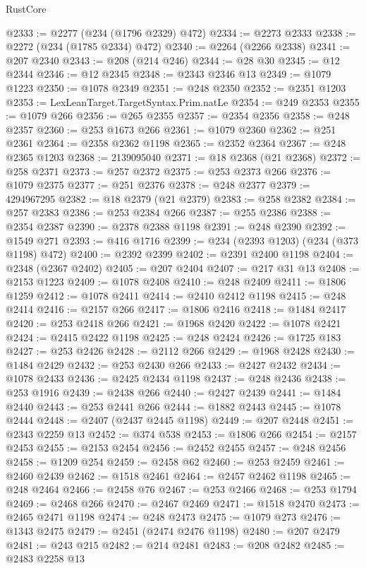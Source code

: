 \begin{lexlean}{RustCore}
\begin{coremodule}
@2333 := @2277 (@234 (@1796 @2329) @472)
@2334 := @2273 @2333
@2338 := @2272 (@234 (@1785 @2334) @472)
@2340 := @2264 (@2266 @2338)
@2341 := @207 @2340
@2343 := @208 (@214 @246)
@2344 := @28 @30
@2345 := @12 @2344
@2346 := @12 @2345
@2348 := @2343 @2346 @13
@2349 := @1079 @1223
@2350 := @1078 @2349
@2351 := @248 @2350
@2352 := @2351 @1203
@2353 := LexLeanTarget.TargetSyntax.Prim.natLe
@2354 := @249 @2353
@2355 := @1079 @266
@2356 := @265 @2355
@2357 := @2354 @2356
@2358 := @248 @2357
@2360 := @253 @1673 @266
@2361 := @1079 @2360
@2362 := @251 @2361
@2364 := @2358 @2362 @1198
@2365 := @2352 @2364
@2367 := @248 @2365 @1203
@2368 := 2139095040
@2371 := @18 @2368 (@21 @2368)
@2372 := @258 @2371
@2373 := @257 @2372
@2375 := @253 @2373 @266
@2376 := @1079 @2375
@2377 := @251 @2376
@2378 := @248 @2377
@2379 := 4294967295
@2382 := @18 @2379 (@21 @2379)
@2383 := @258 @2382
@2384 := @257 @2383
@2386 := @253 @2384 @266
@2387 := @255 @2386
@2388 := @2354 @2387
@2390 := @2378 @2388 @1198
@2391 := @248 @2390
@2392 := @1549 @271
@2393 := @416 @1716
@2399 := @234 (@2393 @1203) (@234 (@373 @1198) @472)
@2400 := @2392 @2399
@2402 := @2391 @2400 @1198
@2404 := @2348 (@2367 @2402)
@2405 := @207 @2404
@2407 := @217 @31 @13
@2408 := @2153 @1223
@2409 := @1078 @2408
@2410 := @248 @2409
@2411 := @1806 @1259
@2412 := @1078 @2411
@2414 := @2410 @2412 @1198
@2415 := @248 @2414
@2416 := @2157 @266
@2417 := @1806 @2416
@2418 := @1484 @2417
@2420 := @253 @2418 @266
@2421 := @1968 @2420
@2422 := @1078 @2421
@2424 := @2415 @2422 @1198
@2425 := @248 @2424
@2426 := @1725 @183
@2427 := @253 @2426
@2428 := @2112 @266
@2429 := @1968 @2428
@2430 := @1484 @2429
@2432 := @253 @2430 @266
@2433 := @2427 @2432
@2434 := @1078 @2433
@2436 := @2425 @2434 @1198
@2437 := @248 @2436
@2438 := @253 @1916
@2439 := @2438 @266
@2440 := @2427 @2439
@2441 := @1484 @2440
@2443 := @253 @2441 @266
@2444 := @1882 @2443
@2445 := @1078 @2444
@2448 := @2407 (@2437 @2445 @1198)
@2449 := @207 @2448
@2451 := @2343 @2259 @13
@2452 := @374 @538
@2453 := @1806 @266
@2454 := @2157 @2453
@2455 := @2153 @2454
@2456 := @2452 @2455
@2457 := @248 @2456
@2458 := @1209 @254
@2459 := @2458 @62
@2460 := @253 @2459
@2461 := @2460 @2439
@2462 := @1518 @2461
@2464 := @2457 @2462 @1198
@2465 := @248 @2464
@2466 := @2458 @76
@2467 := @253 @2466
@2468 := @253 @1794
@2469 := @2468 @266
@2470 := @2467 @2469
@2471 := @1518 @2470
@2473 := @2465 @2471 @1198
@2474 := @248 @2473
@2475 := @1079 @273
@2476 := @1343 @2475
@2479 := @2451 (@2474 @2476 @1198)
@2480 := @207 @2479
@2481 := @243 @215
@2482 := @214 @2481
@2483 := @208 @2482
@2485 := @2483 @2258 @13

\end{coremodule}
\end{lexlean}
